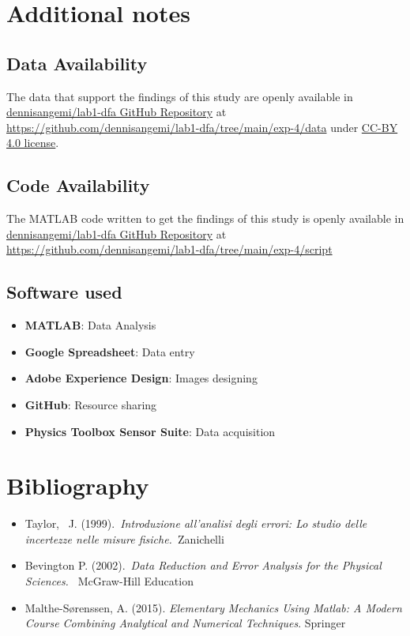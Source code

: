 \documentclass[11pt,a4paper]{article}
\begin{document}
\section{Additional notes}

\subsection{Data Availability}
The data that support the findings of this study are openly available in \href{https://github.com/dennisangemi/lab1-dfa/tree/main/exp-4/data}{dennisangemi/lab1-dfa GitHub Repository} at \href{https://github.com/dennisangemi/lab1-dfa/tree/main/exp-4/data}{https://github.com/dennisangemi/lab1-dfa/tree/main/exp-4/data} under \href{https://creativecommons.org/licenses/by/4.0/}{CC-BY 4.0 license}.

\subsection{Code Availability}
The MATLAB code written to get the findings of this study is openly available in \href{https://github.com/dennisangemi/lab1-dfa/tree/main/exp-2/script}{dennisangemi/lab1-dfa GitHub Repository} at \href{https://github.com/dennisangemi/lab1-dfa/tree/main/exp-4/script}{https://github.com/dennisangemi/lab1-dfa/tree/main/exp-4/script}


\subsection{Software used}
\begin{itemize}
\item
  \textbf{MATLAB}: Data Analysis
\item
  \textbf{Google Spreadsheet}: Data entry
\item
  \textbf{Adobe Experience Design}: Images designing
\item
  \textbf{GitHub}: Resource sharing
 \item
 \textbf{Physics Toolbox Sensor Suite}: Data acquisition
\end{itemize}

\section{Bibliography}
\begin{itemize}
\item
  Taylor,~ J. (1999).~\emph{Introduzione all'analisi degli errori: Lo
  studio delle incertezze nelle misure fisiche.~}Zanichelli
\item
  Bevington P. (2002).~\emph{Data Reduction and Error Analysis for the
  Physical Sciences.~} McGraw-Hill Education ~
\item Malthe-Sørenssen, A. (2015). \emph{Elementary Mechanics Using Matlab: A Modern Course Combining Analytical and Numerical Techniques}. Springer
\end{itemize}
\end{document}

